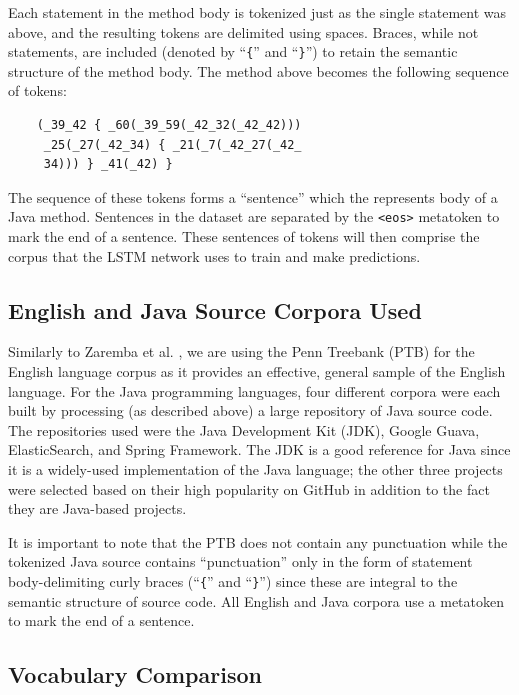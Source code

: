 \documentclass[runningheads,a4paper]{llncs}
\begin{document}
Each statement in the method body is tokenized just as the single statement 
was above, and the resulting tokens are delimited using spaces. Braces, while not 
statements, are included (denoted by ``\texttt\{'' and
``\texttt\}'') to retain the semantic structure of the method body. 
The method above becomes the following sequence of tokens:

\begin{verbatim}
    (_39_42 { _60(_39_59(_42_32(_42_42)))
     _25(_27(_42_34) { _21(_7(_42_27(_42_
     34))) } _41(_42) } 
\end{verbatim}

The sequence of these tokens forms a ``sentence'' which  
the represents body of a Java method.
Sentences in the dataset are separated by the \texttt{<eos>} metatoken
to mark the end of a sentence.
These sentences of
tokens will then comprise the corpus that the LSTM network uses to train 
and make predictions.


\subsection{English and Java Source Corpora Used}

Similarly to Zaremba et al. \cite{Zaremba}, we are using the Penn Treebank (PTB) for the
English language corpus as it provides an effective, general sample of the English
language.
For the Java programming languages, four different corpora were each built
by processing (as described above) a large repository of Java source code. The
repositories used were
the Java Development Kit (JDK), Google Guava, ElasticSearch, and Spring Framework.
The JDK is a good reference for Java since it is a widely-used implementation
of the Java language; the other three projects were selected based on their
high popularity on GitHub in addition to the fact they are
Java-based projects.

It is important to note that the
PTB does not contain any punctuation while the tokenized
Java source contains ``punctuation'' only in the form of statement
body-delimiting curly braces (``\texttt\{'' and ``\texttt\}'')
since these are integral to the semantic structure of source code.
All English and Java corpora use a metatoken to mark the end of a sentence.

\subsection{Vocabulary Comparison}
\end{document}
